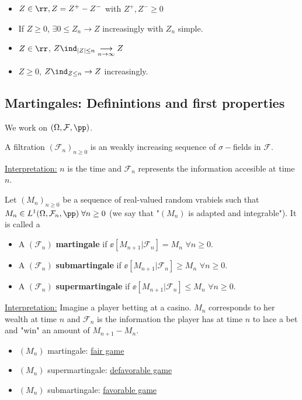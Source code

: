 \documentclass[../main.tex]{subfiles}
\begin{document}
\begin{remark}
  \hfill

  \begin{itemize}
    \item $Z \in \rr, Z = Z^+ - Z^-$ with $Z^+, Z^- \geq 0$
    \item If $Z \geq 0$, $\exists 0 \leq Z_n \to Z$ increasingly with $Z_n$ simple.
    \item $Z \in \rr$, $Z \ind_{|Z| \leq n} \underset{n \to
      \infty}{\longrightarrow} Z$
    \item $Z \geq 0$, $Z\ind_{Z \leq n} \to Z$ increasingly.
  \end{itemize}
\end{remark}

\subsection{Martingales: Definintions and first properties}
We work on $(\Omega, \mathcal{F}, \pp)$.

\begin{definition}
  A filtration $(\mathcal{F}_n)_{n \geq 0}$ is an weakly increasing sequence of
  $\sigma-$fields in $\mathcal{F}$.
\end{definition}
\underline{Interpretation:} $n$ is the time and $\mathcal{F}_n$ represents the
information accesible at time $n$.

\begin{definition}
  Let $(M_n)_{n \geq 0}$ be a sequence of real-valued random vrabiels such that 
  $M_n \in L^1(\Omega, \mathcal{F}_n, \pp) \;\forall n \geq 0$ (we say that
  "$(M_n)$ is adapted and integrable"). It is called a
  \begin{itemize}
    \item A $(\mathcal{F}_n)$ \textbf{martingale} if $\ee[M_{n+1} |
      \mathcal{F}_n] = M_n$
      $\forall n \geq 0$.
    \item A $(\mathcal{F}_n)$ \textbf{submartingale} if $\ee[M_{n+1} |
      \mathcal{F}_n]
      \geq M_n$
      $\forall n \geq 0$.
    \item A $(\mathcal{F}_n)$ \textbf{supermartingale} if $\ee[M_{n+1} |
      \mathcal{F}_n]
      \leq M_n$
      $\forall n \geq 0$.
  \end{itemize}
\end{definition}
\underline{Interpretation:} Imagine a player betting at a casino. $M_n$
corresponds to her wealth at time $n$ and $\mathcal{F}_n$ is the information the
player has at time $n$ to lace a bet and "win" an amount of $M_{n+1} - M_n$.
\begin{itemize}
  \item $(M_n)$ martingale: \underline{fair game}
  \item $(M_n)$ supermartingale: \underline{defavorable game}
  \item $(M_n)$ submartingale: \underline{favorable game}
\end{itemize}
\end{document}
